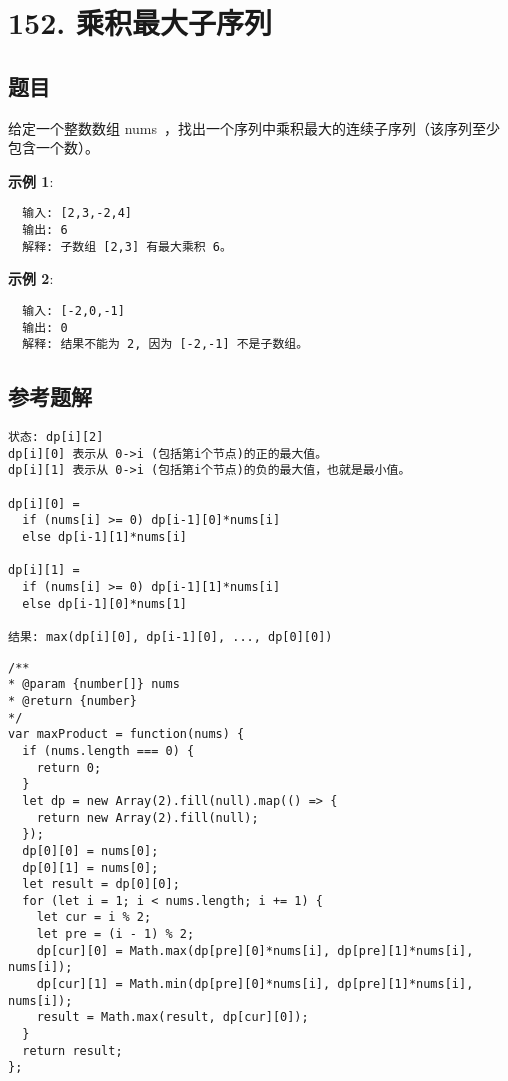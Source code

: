 \newpage
\section{152. 乘积最大子序列}
\label{leetcode:152}

\subsection{题目}

给定一个整数数组 nums ，找出一个序列中乘积最大的连续子序列（该序列至少包含一个数）。

\textbf{示例 1}:

\begin{verbatim}
  输入: [2,3,-2,4]
  输出: 6
  解释: 子数组 [2,3] 有最大乘积 6。
\end{verbatim}

\textbf{示例 2}:

\begin{verbatim}
  输入: [-2,0,-1]
  输出: 0
  解释: 结果不能为 2, 因为 [-2,-1] 不是子数组。
\end{verbatim}

\subsection{参考题解}

\begin{verbatim}
状态: dp[i][2]
dp[i][0] 表示从 0->i (包括第i个节点)的正的最大值。
dp[i][1] 表示从 0->i (包括第i个节点)的负的最大值，也就是最小值。

dp[i][0] =
  if (nums[i] >= 0) dp[i-1][0]*nums[i]
  else dp[i-1][1]*nums[i]

dp[i][1] =
  if (nums[i] >= 0) dp[i-1][1]*nums[i]
  else dp[i-1][0]*nums[1]

结果: max(dp[i][0], dp[i-1][0], ..., dp[0][0])
\end{verbatim}

\begin{verbatim}
/**
* @param {number[]} nums
* @return {number}
*/
var maxProduct = function(nums) {
  if (nums.length === 0) {
    return 0;
  }
  let dp = new Array(2).fill(null).map(() => {
    return new Array(2).fill(null);
  });
  dp[0][0] = nums[0];
  dp[0][1] = nums[0];
  let result = dp[0][0];
  for (let i = 1; i < nums.length; i += 1) {
    let cur = i % 2;
    let pre = (i - 1) % 2;
    dp[cur][0] = Math.max(dp[pre][0]*nums[i], dp[pre][1]*nums[i], nums[i]);
    dp[cur][1] = Math.min(dp[pre][0]*nums[i], dp[pre][1]*nums[i], nums[i]);
    result = Math.max(result, dp[cur][0]);
  }
  return result;
};
\end{verbatim}
